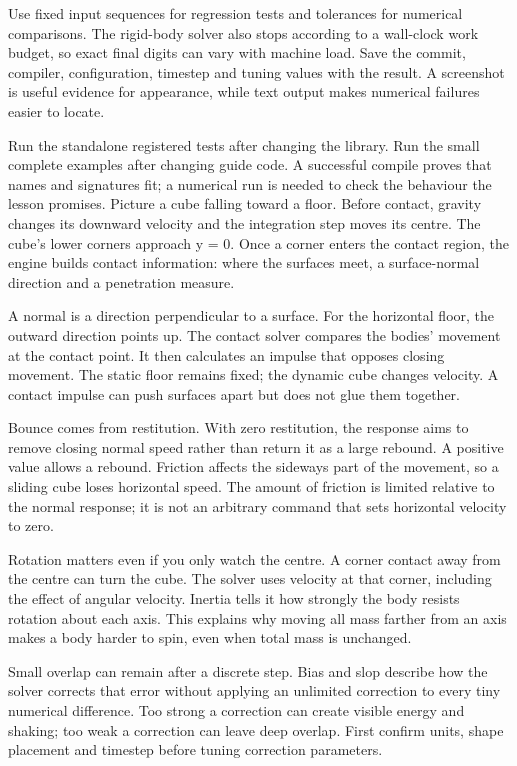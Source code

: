 \documentclass[11pt,a4paper]{article}
\begin{document}
Use fixed input sequences for regression tests and tolerances for numerical comparisons. The rigid-body solver also stops according to a wall-clock work budget, so exact final digits can vary with machine load. Save the commit, compiler, configuration, timestep and tuning values with the result. A screenshot is useful evidence for appearance, while text output makes numerical failures easier to locate.

Run the standalone registered tests after changing the library. Run the small complete examples after changing guide code. A successful compile proves that names and signatures fit; a numerical run is needed to check the behaviour the lesson promises.
Picture a cube falling toward a floor. Before contact, gravity changes its downward velocity and the integration step moves its centre. The cube's lower corners approach y = 0. Once a corner enters the contact region, the engine builds contact information: where the surfaces meet, a surface-normal direction and a penetration measure.

A normal is a direction perpendicular to a surface. For the horizontal floor, the outward direction points up. The contact solver compares the bodies' movement at the contact point. It then calculates an impulse that opposes closing movement. The static floor remains fixed; the dynamic cube changes velocity. A contact impulse can push surfaces apart but does not glue them together.

Bounce comes from restitution. With zero restitution, the response aims to remove closing normal speed rather than return it as a large rebound. A positive value allows a rebound. Friction affects the sideways part of the movement, so a sliding cube loses horizontal speed. The amount of friction is limited relative to the normal response; it is not an arbitrary command that sets horizontal velocity to zero.

Rotation matters even if you only watch the centre. A corner contact away from the centre can turn the cube. The solver uses velocity at that corner, including the effect of angular velocity. Inertia tells it how strongly the body resists rotation about each axis. This explains why moving all mass farther from an axis makes a body harder to spin, even when total mass is unchanged.

Small overlap can remain after a discrete step. Bias and slop describe how the solver corrects that error without applying an unlimited correction to every tiny numerical difference. Too strong a correction can create visible energy and shaking; too weak a correction can leave deep overlap. First confirm units, shape placement and timestep before tuning correction parameters.
\end{document}
